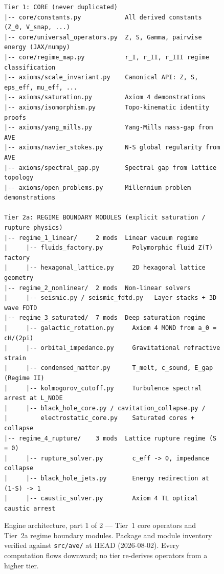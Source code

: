 \begin{figure}[H]
\centering
\begin{verbatim}
Tier 1: CORE (never duplicated)
|-- core/constants.py            All derived constants (Z_0, V_snap, ...)
|-- core/universal_operators.py  Z, S, Gamma, pairwise energy (JAX/numpy)
|-- core/regime_map.py           r_I, r_II, r_III regime classification
|-- axioms/scale_invariant.py    Canonical API: Z, S, eps_eff, mu_eff, ...
|-- axioms/saturation.py         Axiom 4 demonstrations
|-- axioms/isomorphism.py        Topo-kinematic identity proofs
|-- axioms/yang_mills.py         Yang-Mills mass-gap from AVE
|-- axioms/navier_stokes.py      N-S global regularity from AVE
|-- axioms/spectral_gap.py       Spectral gap from lattice topology
|-- axioms/open_problems.py      Millennium problem demonstrations

Tier 2a: REGIME BOUNDARY MODULES (explicit saturation / rupture physics)
|-- regime_1_linear/     2 mods  Linear vacuum regime
|     |-- fluids_factory.py        Polymorphic fluid Z(T) factory
|     |-- hexagonal_lattice.py     2D hexagonal lattice geometry
|-- regime_2_nonlinear/  2 mods  Non-linear solvers
|     |-- seismic.py / seismic_fdtd.py   Layer stacks + 3D wave FDTD
|-- regime_3_saturated/  7 mods  Deep saturation regime
|     |-- galactic_rotation.py     Axiom 4 MOND from a_0 = cH/(2pi)
|     |-- orbital_impedance.py     Gravitational refractive strain
|     |-- condensed_matter.py      T_melt, c_sound, E_gap (Regime II)
|     |-- kolmogorov_cutoff.py     Turbulence spectral arrest at L_NODE
|     |-- black_hole_core.py / cavitation_collapse.py /
|         electrostatic_core.py    Saturated cores + collapse
|-- regime_4_rupture/    3 mods  Lattice rupture regime (S = 0)
|     |-- rupture_solver.py        c_eff -> 0, impedance collapse
|     |-- black_hole_jets.py       Energy redirection at (1-S) -> 1
|     |-- caustic_solver.py        Axiom 4 TL optical caustic arrest
\end{verbatim}
\caption{Engine architecture, part 1 of 2 --- Tier~1 core operators and
Tier~2a regime boundary modules.
Package and module inventory verified against \texttt{src/ave/} at HEAD
(2026-08-02).
Every computation flows downward; no tier re-derives operators
from a higher tier.}
\label{fig:engine_tiers}
\end{figure}

